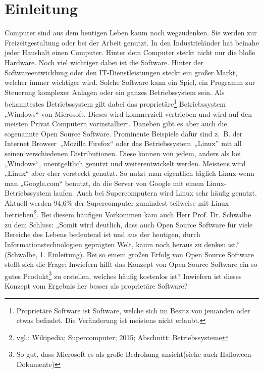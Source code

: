\documentclass[a4paper,12pt]{article}
\begin{document}
\section{Einleitung}
Computer sind aus dem heutigen Leben kaum noch wegzudenken. Sie werden zur Freizeitgestaltung oder bei der Arbeit genutzt. In den Industrieländer hat beinahe jeder Haushalt einen Computer. Hinter dem Computer steckt nicht nur die bloße Hardware. Noch viel wichtiger dabei ist die Software. Hinter der Softwareentwicklung oder den IT-Dienstleistungen steckt ein großer Markt, welcher immer wichtiger wird. Solche Software kann ein Spiel, ein Programm zur Steuerung komplexer Anlagen oder ein ganzes Betriebssystem sein. Als bekanntestes Betriebssystem gilt dabei das proprietäre\footnote{Proprietäre Software ist Software, welche sich im Besitz von jemanden oder etwas befindet. Die Veränderung ist meistens nicht erlaubt.} Betriebssystem „Windows“ von Microsoft. Dieses wird kommerziell vertrieben und wird auf den meisten Privat Computern vorinstalliert. Daneben gibt es aber auch die sogenannte Open Source Software. Prominente Beispiele dafür sind z.~B. der Internet Browser~„Mozilla Firefox“ oder das Betriebssystem~„Linux” mit all seinen verschiedenen Distributionen. Diese können von jedem, anders als bei „Windows“, unentgeltlich genutzt und weiterentwickelt werden. Meistens wird „Linux“ aber eher versteckt genutzt. So nutzt man eigentlich täglich Linux wenn man „Google.com“ benutzt, da die Server von Google mit einem Linux-Betriebssystem laufen. Auch bei Supercomputern wird Linux sehr häufig genutzt. Aktuell werden 94,6\% der Supercomputer zumindest teilweise mit Linux betrieben\footnote{vgl.: Wikipedia; Supercomputer; 2015; Abschnitt: Betriebssysteme}. Bei diesem häufigen Vorkommen kam auch Herr Prof. Dr. Schwalbe zu dem Schluss: „Somit wird deutlich, dass auch Open Source Software für viele Bereiche des Lebens bedeutend ist und aus der heutigen, durch Informationstechnologien geprägten Welt, kaum noch heraus zu denken ist.“ (Schwalbe, 1. Einleitung). Bei so einem großen Erfolg von Open Source Software stellt sich die Frage: Inwiefern hilft das Konzept von Open Source Software ein so gutes Produkt\footnote{So gut, dass Microsoft es als große Bedrohung ansieht(siehe auch Halloween-Dokumente)} zu erstellen, welches häufig kostenlos ist? Inwiefern ist dieses Konzept vom Ergebnis her besser als proprietäre Software?\\
\end{document}
